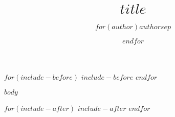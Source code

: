 \documentclass[english,xcolor=table,t
$if(classoptions)$
    ,$classoptions$
$endif$
]{beamer}
\title{$title$}
\author{$for(author)$$author$$sep$ \and $endfor$}
\institute{$institute$}
\begin{document}
$for(include-before)$
$include-before$
$endfor$

\begin{frame}

$body$

\end{frame}

$for(include-after)$
$include-after$
$endfor$
\end{document}
